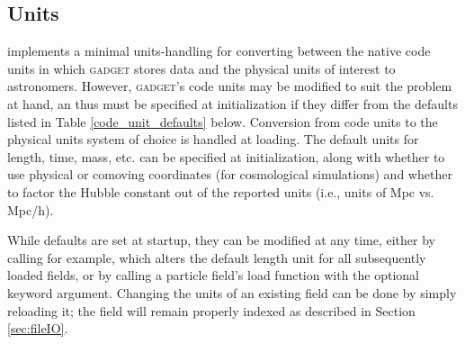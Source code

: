 \subsection{Units}
\label{sec:units}
 implements a minimal units-handling for converting between the native code units in which \textsc{gadget} stores data and the physical units of interest to astronomers.  
However, \textsc{gadget}'s code units may be modified to suit the problem at hand, an thus must be specified at  initialization if they differ from the defaults listed in Table \ref{code_unit_defaults} below.
Conversion from code units to the physical units system of choice is handled at loading.
The default units for length, time, mass, etc. can be specified at initialization, along with whether to use physical or comoving coordinates (for cosmological simulations) and whether to factor the Hubble constant out of the reported units (i.e., units of Mpc vs. Mpc/h).

While defaults are set at startup, they can be modified at any time, either by calling  for example, which alters the default length unit for all subsequently loaded fields, or by calling a particle field's load function with the optional  keyword argument.  
Changing the units of an existing field can be done by simply reloading it; the field will remain properly indexed as described in Section \ref{sec:fileIO}.